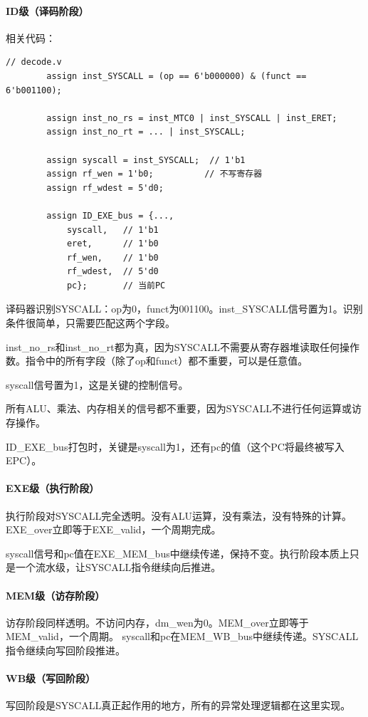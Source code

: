 \documentclass[a4paper]{article}
\begin{document}
	\paragraph{ID级（译码阶段）}
	相关代码：
	\begin{lstlisting}[caption={ID}]
		// decode.v
		assign inst_SYSCALL = (op == 6'b000000) & (funct == 6'b001100);
		
		assign inst_no_rs = inst_MTC0 | inst_SYSCALL | inst_ERET;
		assign inst_no_rt = ... | inst_SYSCALL;
		
		assign syscall = inst_SYSCALL;  // 1'b1
		assign rf_wen = 1'b0;          // 不写寄存器
		assign rf_wdest = 5'd0;
		
		assign ID_EXE_bus = {...,
			syscall,   // 1'b1
			eret,      // 1'b0
			rf_wen,    // 1'b0
			rf_wdest,  // 5'd0
			pc};       // 当前PC
	\end{lstlisting}
	译码器识别SYSCALL：op为0，funct为001100。inst\_SYSCALL信号置为1。识别条件很简单，只需要匹配这两个字段。
	
	inst\_no\_rs和inst\_no\_rt都为真，因为SYSCALL不需要从寄存器堆读取任何操作数。指令中的所有字段（除了op和funct）都不重要，可以是任意值。
	
	syscall信号置为1，这是关键的控制信号。
	
	所有ALU、乘法、内存相关的信号都不重要，因为SYSCALL不进行任何运算或访存操作。
	
	ID\_EXE\_bus打包时，关键是syscall为1，还有pc的值（这个PC将最终被写入EPC）。
	\paragraph{EXE级（执行阶段）}
	执行阶段对SYSCALL完全透明。没有ALU运算，没有乘法，没有特殊的计算。EXE\_over立即等于EXE\_valid，一个周期完成。
	
	syscall信号和pc值在EXE\_MEM\_bus中继续传递，保持不变。执行阶段本质上只是一个流水级，让SYSCALL指令继续向后推进。
	\paragraph{MEM级（访存阶段）}
	访存阶段同样透明。不访问内存，dm\_wen为0。MEM\_over立即等于MEM\_valid，一个周期。
	syscall和pc在MEM\_WB\_bus中继续传递。SYSCALL指令继续向写回阶段推进。
	\paragraph{WB级（写回阶段）}
	写回阶段是SYSCALL真正起作用的地方，所有的异常处理逻辑都在这里实现。
	
\end{document}
